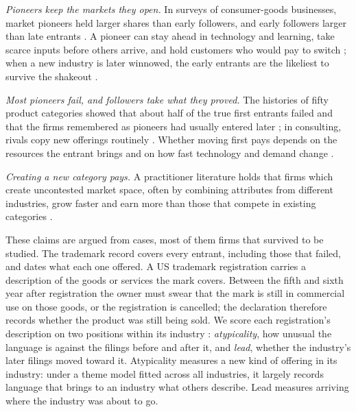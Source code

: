 \emph{Pioneers keep the markets they open.} In surveys of consumer-goods
businesses, market pioneers held larger shares than early followers, and
early followers larger than late entrants \citep{RobinsonFornell1985}. A
pioneer can stay ahead in technology and learning, take scarce inputs
before others arrive, and hold customers who would pay to switch
\citep{LiebermanMontgomery1988}; when a new industry is later winnowed,
the early entrants are the likeliest to survive the shakeout
\citep{KlepperMiller1995, Klepper1997}.

\emph{Most pioneers fail, and followers take what they proved.} The
histories of fifty product categories showed that about half of the true
first entrants failed and that the firms remembered as pioneers had
usually entered later \citep{GolderTellis1993}; in consulting, rivals
copy new offerings routinely \citep{SemadeniAnderson2010}. Whether moving
first pays depends on the resources the entrant brings
\citep{LiebermanMontgomery1998} and on how fast technology and demand
change \citep{SuarezLanzolla2007}.

\emph{Creating a new category pays.} A practitioner literature holds that
firms which create uncontested market space, often by combining
attributes from different industries, grow faster and earn more than
those that compete in existing categories \citep{KimMauborgne2004}.

These claims are argued from cases, most of them firms that survived to
be studied. The trademark record covers every entrant, including those
that failed, and dates what each one offered. A US trademark registration
carries a description of the goods or services the mark covers. Between
the fifth and sixth year after registration the owner must swear that the
mark is still in commercial use on those goods, or the registration is
cancelled; the declaration therefore records whether the product was
still being sold. We score each registration's description on two
positions within its industry \citep{SilverCorpus2026}:
\emph{atypicality}, how unusual the language is against the filings
before and after it, and \emph{lead}, whether the industry's later
filings moved toward it. Atypicality measures a new kind of offering in
its industry: under a theme model fitted across all industries, it
largely records language that brings to an industry what others describe.
Lead measures arriving where the industry was about to go.

